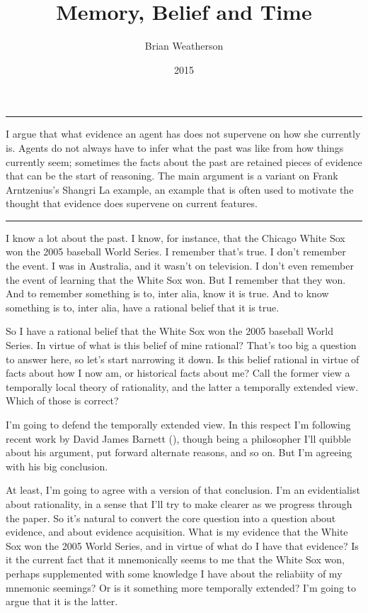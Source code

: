 \documentclass[
  10pt,
  letterpaper,
  DIV=11,
  numbers=noendperiod,
  twoside]{scrartcl}
\title{Memory, Belief and Time}
\author{Brian Weatherson}
\date{2015}
\renewenvironment{abstract}
 {\vspace{-1.25cm}
 \quotation\small\noindent\rule{\linewidth}{.5pt}\par\smallskip
 \noindent }
 {\par\noindent\rule{\linewidth}{.5pt}\endquotation}
\begin{document}
\maketitle
\begin{abstract}
I argue that what evidence an agent has does not supervene on how she
currently is. Agents do not always have to infer what the past was like
from how things currently seem; sometimes the facts about the past are
retained pieces of evidence that can be the start of reasoning. The main
argument is a variant on Frank Arntzenius's Shangri La example, an
example that is often used to motivate the thought that evidence does
supervene on current features.
\end{abstract}


I know a lot about the past. I know, for instance, that the Chicago
White Sox won the 2005 baseball World Series. I remember that's true. I
don't remember the event. I was in Australia, and it wasn't on
television. I don't even remember the event of learning that the White
Sox won. But I remember that they won. And to remember something is to,
inter alia, know it is true. And to know something is to, inter alia,
have a rational belief that it is true.

So I have a rational belief that the White Sox won the 2005 baseball
World Series. In virtue of what is this belief of mine rational? That's
too big a question to answer here, so let's start narrowing it down. Is
this belief rational in virtue of facts about how I now am, or
historical facts about me? Call the former view a temporally local
theory of rationality, and the latter a temporally extended view. Which
of those is correct?

I'm going to defend the temporally extended view. In this respect I'm
following recent work by David James Barnett
(), though being a philosopher I'll
quibble about his argument, put forward alternate reasons, and so on.
But I'm agreeing with his big conclusion.

At least, I'm going to agree with a version of that conclusion. I'm an
evidentialist about rationality, in a sense that I'll try to make
clearer as we progress through the paper. So it's natural to convert the
core question into a question about evidence, and about evidence
acquisition. What is my evidence that the White Sox won the 2005 World
Series, and in virtue of what do I have that evidence? Is it the current
fact that it mnemonically seems to me that the White Sox won, perhaps
supplemented with some knowledge I have about the reliabiity of my
mnemonic seemings? Or is it something more temporally extended? I'm
going to argue that it is the latter.
\end{document}
